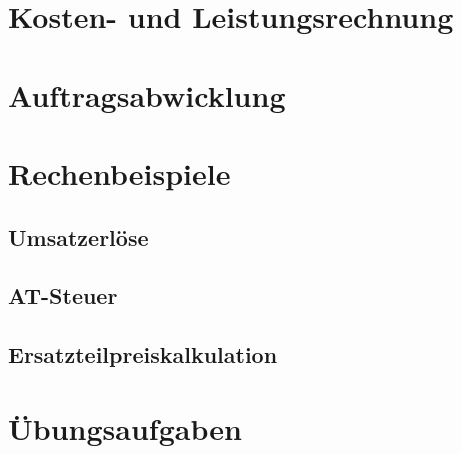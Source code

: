 


\chapter{Kosten- und Leistungsrechnung}

\chapter{Auftragsabwicklung}





\chapter{Rechenbeispiele}%

\section{Umsatzerlöse}\label{sec:01-Umsatzerloese}

\section{AT-Steuer}\label{sec:02-AT-Steuer}

\section{Ersatzteilpreiskalkulation}\label{sec:03-Ersatzteilpreiskalkulation}





\chapter{Übungsaufgaben}


